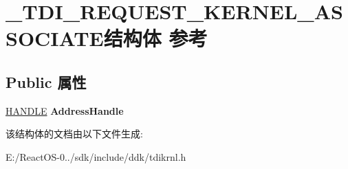 \hypertarget{struct___t_d_i___r_e_q_u_e_s_t___k_e_r_n_e_l___a_s_s_o_c_i_a_t_e}{}\section{\+\_\+\+T\+D\+I\+\_\+\+R\+E\+Q\+U\+E\+S\+T\+\_\+\+K\+E\+R\+N\+E\+L\+\_\+\+A\+S\+S\+O\+C\+I\+A\+T\+E结构体 参考}
\label{struct___t_d_i___r_e_q_u_e_s_t___k_e_r_n_e_l___a_s_s_o_c_i_a_t_e}
\subsection*{Public 属性}
\begin{DoxyCompactItemize}
\item 
\mbox{\label{struct___t_d_i___r_e_q_u_e_s_t___k_e_r_n_e_l___a_s_s_o_c_i_a_t_e_a8aca5fab572131a9acec658d864e82ba}} 
\hyperlink{interfacevoid}{H\+A\+N\+D\+LE} {\bfseries Address\+Handle}
\end{DoxyCompactItemize}


该结构体的文档由以下文件生成\+:\begin{DoxyCompactItemize}
\item 
E\+:/\+React\+O\+S-\/0../sdk/include/ddk/tdikrnl.\+h\end{DoxyCompactItemize}
